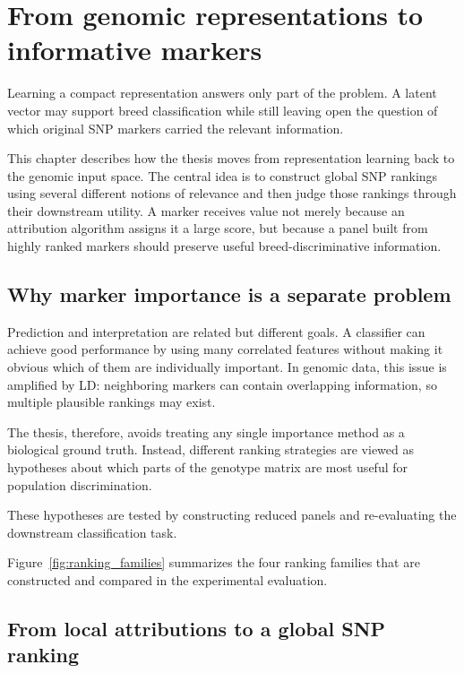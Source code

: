\chapter{From genomic representations to informative markers}
\label{chap:feature_importance}

Learning a compact representation answers only part of the problem. A
latent vector may support breed classification while still leaving
open the question of which original SNP markers carried the relevant
information.

This chapter describes how the thesis moves from representation
learning back to the genomic input space. The central idea is to
construct global SNP rankings using several different notions of
relevance and then judge those rankings through their downstream
utility. A marker receives value not merely because an attribution
algorithm assigns it a large score, but because a panel built from
highly ranked markers should preserve useful breed-discriminative
information.

\section{Why marker importance is a separate problem}
\label{sec:why_marker_importance}

Prediction and interpretation are related but different goals. A
classifier can achieve good performance by using many correlated
features without making it obvious which of them are individually
important. In genomic data, this issue is amplified by LD: neighboring
markers can contain overlapping information, so multiple plausible
rankings may exist.

The thesis, therefore, avoids treating any single importance method as
a biological ground truth. Instead, different ranking strategies are
viewed as hypotheses about which parts of the genotype matrix are most
useful for population discrimination.

These hypotheses are tested by constructing reduced panels and
re-evaluating the downstream classification task.



Figure~\ref{fig:ranking_families} summarizes the four ranking families
that are constructed and compared in the experimental evaluation.

\section{From local attributions to a global SNP ranking}
\label{sec:local_to_global_ranking}

